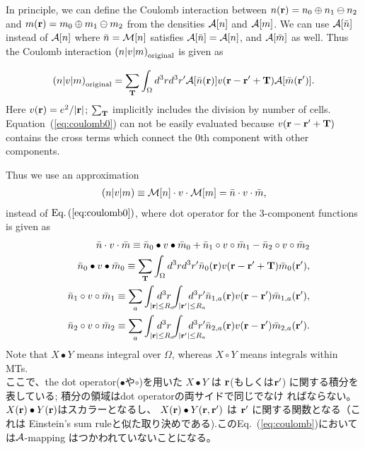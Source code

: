 \documentclass[twocolumn,showpacs,preprintnumbers,amsmath,amssymb,floatfix]{revtex4-1}
\newcommand{\bfr}{{\bf r}}
\newcommand{\bfT}{{\bf T}}
\newcommand{\ooplus}{\oplus}
\newcommand{\oominus}{\ominus}
\def\calR{{\cal A}}
\newcommand{\req}[1]{\mbox{Eq.~\!(\ref{#1})}}
\def\MM{{\cal M}}
\def\inta{\int_{|\bfr|\leq R_a}\!\!\!\!\!\!\!\!\!\!\!\!}
\def\intad{\int_{|\bfr'|\leq R_a}\!\!\!\!\!\!\!\!\!\!\!\!}
\def\MM{{\cal M}}
\def\inta{\int_{|\bfr|\leq R_a}\!\!\!\!\!\!\!\!\!\!\!\!}
\def\intad{\int_{|\bfr'|\leq R_a}\!\!\!\!\!\!\!\!\!\!\!\!}
\begin{document}
In principle, we can define the Coulomb interaction
between $n(\bfr)=n_0\ooplus n_1 \oominus n_2$ and $m(\bfr)=m_0 \ooplus
m_1 \oominus m_2$ from the densities $\calR[n]$ and $\calR[m]$.  We can
use $\calR[\bar{n}]$ instead of $\calR[n]$ where $\bar{n}=\MM[n]$
satisfies $\calR[\bar{n}]=\calR[n]$, and $\calR[\bar{m}]$ as well.  Thus
the Coulomb interaction $\left(n|v|m\right)_{\rm original}$ is given as
\begin{widetext}
\begin{eqnarray}
\left(n|v|m\right)_{\rm original}=\sum_{\bfT} \int_\Omega d^3r d^3r' 
\calR[\bar{n}(\bfr)] v(\bfr-\bfr'+\bfT) \calR[\bar{m}(\bfr')].
\label{eq:coulomb0}
\end{eqnarray}
Here $v(\bfr)=e^2/|\bfr|$; $\sum_{\bfT}$ implicitly includes the
division by number of cells. Equation~(\ref{eq:coulomb0}) can not be
easily evaluated because $v(\bfr-\bfr'+\bfT)$ contains the cross terms
which connect the 0th component with other components.

Thus we use an approximation 
\begin{eqnarray}
\left(n|v|m\right)\equiv\MM[n] \cdot v \cdot \MM[m] = \bar{n} \cdot v \cdot \bar{m}, \label{eq:coulomb}
\end{eqnarray}
instead of $\req{eq:coulomb0}$, where dot operator for the 3-component
functions is given as
\begin{eqnarray}
&&\bar{n} \cdot v \cdot \bar{m} \equiv
\bar{n}_0 \bullet v \bullet \bar{m}_0 + \bar{n}_{1} \circ v \circ
\bar{m}_{1} - \bar{n}_{2} \circ v \circ \bar{m}_{2}\\
&&\bar{n}_0 \bullet v \bullet \bar{m}_0 \equiv \sum_{\bfT} \int_\Omega d^3r d^3r' \bar{n}_0(\bfr)v(\bfr-\bfr'+\bfT) \bar{m}_0(\bfr'), \label{eq:n0vn0}\\
&&\bar{n}_1 \circ v \circ \bar{m}_1 \equiv 
\sum_a \inta d^3r \intad d^3r' \bar{n}_{1,a}(\bfr)v(\bfr-\bfr') \bar{m}_{1,a}(\bfr'), \label{eq:n1vn1}\\
&&\bar{n}_2 \circ v \circ \bar{m}_2 \equiv \sum_a \inta d^3r \intad d^3r' \bar{n}_{2,a}(\bfr)v(\bfr-\bfr') \bar{m}_{2,a}(\bfr'). \label{eq:n2vn2}
\end{eqnarray}
Note that $X \bullet Y$ means integral over $\Omega$, whereas $X \circ
Y$ means integrals within MTs.\\
ここで、the dot operator($\bullet$や$\circ$)を用いた $X \bullet Y$ は $\bfr$(もしくは$\bfr'$)
に関する積分を表している; 積分の領域はdot operatorの両サイドで同じでなけ
ればならない。 $X(\bfr) \bullet Y(\bfr)$はスカラーとなるし、
$X(\bfr) \bullet Y(\bfr,\bfr')$ は $\bfr'$ に関する関数となる（これは
Einstein's sum ruleと似た取り決めである).この\req{eq:coulomb}においては$\calR$-mapping
はつかわれていないことになる。


\end{widetext}
\end{document}

